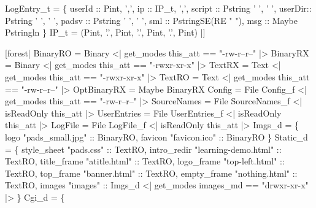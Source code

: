 \begin{code}
\mbox{}
   LogEntry_t = \{
    userId :: Pint,        ',',   
    ip     :: IP_t,        ',',   
    script :: Pstring ' ', ' ',   
    userDir:: Pstring ' ', ' ',   
    padsv  :: Pstring ' ', ' ',   
    sml    :: PstringSE(RE " "),  
    msg    :: Maybe Pstringln     
  \}
\mbox{}
   IP_t = (Pint, '.', Pint, '.', Pint, '.', Pint)
|]
\end{code}

\begin{code}
[forest|
   BinaryRO    = Binary         <| get_modes this_att ==  "-rw-r--r--" |>
   BinaryRX    = Binary         <| get_modes this_att ==  "-rwxr-xr-x" |>
   TextRX      = Text           <| get_modes this_att ==  "-rwxr-xr-x" |>
   TextRO      = Text           <| get_modes this_att ==  "-rw-r--r--" |>
\mbox{}  
   OptBinaryRX = Maybe BinaryRX
\mbox{}
   Config      = File Config_f       <| get_modes this_att ==  "-rw-r--r--" |>
   SourceNames = File SourceNames_f  <| isReadOnly this_att |>
   UserEntries = File UserEntries_f  <| isReadOnly this_att |>
   LogFile     = File LogFile_f      <| isReadOnly this_att |>
\mbox{}
   Imgs_d =  \{
    logo     "pads_small.jpg" :: BinaryRO,
    favicon  "favicon.ico"    :: BinaryRO
  \}
\mbox{}
   Static_d =  \{
    style_sheet "pads.css"           :: TextRO,   
    intro_redir "learning-demo.html" :: TextRO,   
    title_frame "atitle.html"        :: TextRO,   
    logo_frame  "top-left.html"      :: TextRO,   
    top_frame   "banner.html"        :: TextRO,   
    empty_frame "nothing.html"       :: TextRO,
    images      "images"             :: Imgs_d  <| get_modes images_md == "drwxr-xr-x" |>
  \}
\mbox{}
   Cgi_d =  \{

\end{code}
